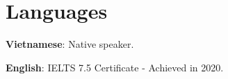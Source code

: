\documentclass[a4paper,20pt]{article}
\begin{document}
\section{Languages}
\begin{description}[font=$\bullet$]
\item {\textbf{Vietnamese}: Native speaker.}
\vspace{-5pt}
\item {\textbf{English}: IELTS 7.5 Certificate - Achieved in 2020.}

\end{description}

\vspace{-5pt}
\end{document}
